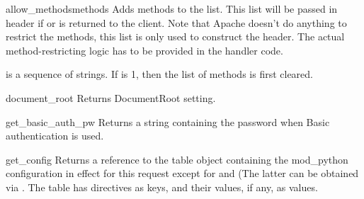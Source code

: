 \begin{methoddesc}[request]{allow_methods}{methods}
Adds methods to the  list. This list
will be passed in  header if
 or 
is returned to the client. Note that Apache doesn't do anything to
restrict the methods, this list is only used to construct the
header. The actual method-restricting logic has to be provided in the
handler code.

 is a sequence of strings. If  is 1, then
the list of methods is first cleared.
\end{methoddesc}

\begin{methoddesc}[request]{document_root}{}
Returns DocumentRoot setting.
\end{methoddesc}

\begin{methoddesc}[request]{get_basic_auth_pw}{}
Returns a string containing the password when Basic authentication is
used.
\end{methoddesc}

\begin{methoddesc}[request]{get_config}{}
Returns a reference to the table object containing the mod_python
configuration in effect for this request except for
 and  (The latter can be
obtained via . The table has directives as
keys, and their values, if any, as values.
\end{methoddesc}

